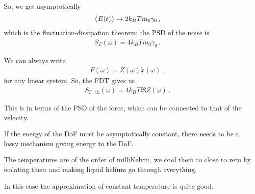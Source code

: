 \documentclass[main.tex]{subfiles}
\begin{document}
So, we get asymptotically 
%
\begin{align}
\expval{E(t)} \to 2 k_B T m_0 \gamma_0 
\,,
\end{align}
%
which is the fluctuation-dissipation theorem: the PSD of the noise is 
%
\begin{align}
S_F(\omega ) = 4 k_B T m_0 \gamma_0 
\,.
\end{align}

We can always write 
%
\begin{align}
F(\omega ) = Z(\omega ) \dot{x}(\omega )
\,,
\end{align}
%
for any linear system.
So, the FDT gives us 
%
\begin{align}
S _{\text{F, th}} (\omega ) = 4 k_B T \Re{Z(\omega )}
\,.
\end{align}

This is in terms of the PSD of the force, which can be connected to that of the velocity.

If the energy of the DoF must be asymptotically constant, there needs to be a lossy mechanism giving energy to the DoF. 


The temperatures are of the order of milliKelvin, we cool them to close to zero by isolating them and making liquid helium go through everything. 

In this case the approximation of constant temperature is quite good.
\end{document}
